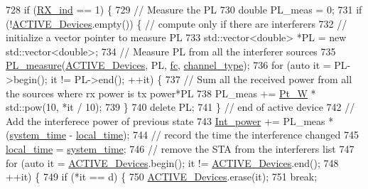 \begin{DoxyCode}
{{{728         \textcolor{keywordflow}{if} (\hyperlink{classAP_af5b1c2bc10a9ce9f3007bbf37f95f144}{RX\_ind} == 1) \{
729             \textcolor{comment}{// Measure the PL}
730             \textcolor{keywordtype}{double} PL\_meas = 0;
731             \textcolor{keywordflow}{if} (!\hyperlink{classAP_ab6dd8d2144b1be8dea239c3d76fc60cd}{ACTIVE\_Devices}.empty()) \{ \textcolor{comment}{// compute only if there are interferers}
732                 \textcolor{comment}{// initialize a vector pointer to measure PL}
733                 std::vector<double> *PL = \textcolor{keyword}{new} std::vector<double>;
734                 \textcolor{comment}{// Measure PL from all the interferer sources}
735                 \hyperlink{PL__measure_8cpp_afb433c5f099becf495d3c9d29ffc707d}{PL\_measure}(\hyperlink{classAP_ab6dd8d2144b1be8dea239c3d76fc60cd}{ACTIVE\_Devices}, PL, \hyperlink{classAP_af7f928faaa72cbfe5c4f905cb146a564}{fc}, 
      \hyperlink{classAP_a334f5b7be9725824797db57032de80e2}{channel\_type});
736                 \textcolor{keywordflow}{for} (\textcolor{keyword}{auto} it = PL->begin(); it != PL->end(); ++it) \{
737                     \textcolor{comment}{// Sum all the received power from all the sources where rx power is tx power*PL}
738                     PL\_meas += \hyperlink{classAP_a10998008dbe6e924211af8d9ee155534}{Pt\_W} * std::pow(10, *it / 10);
739                 \}
740                 \textcolor{keyword}{delete} PL;
741             \} \textcolor{comment}{// end of active device}
742               \textcolor{comment}{// Add the interferece power of previous state}
743             \hyperlink{classAP_a6c2c3e61c88d4bba7d949f5663b3ea10}{Int\_power} += PL\_meas * (\hyperlink{AP_8cpp_aaa03a568dc1d9d3391286ea24b9cfb63}{system\_time} - \hyperlink{classAP_ab31a52cd05ca5daf9ccd5d24941fe395}{local\_time});
744             \textcolor{comment}{// record the time the interference changed}
745             \hyperlink{classAP_ab31a52cd05ca5daf9ccd5d24941fe395}{local\_time} = \hyperlink{AP_8cpp_aaa03a568dc1d9d3391286ea24b9cfb63}{system\_time};
746             \textcolor{comment}{// remove the STA from the interferers list}
747             \textcolor{keywordflow}{for} (\textcolor{keyword}{auto} it = \hyperlink{classAP_ab6dd8d2144b1be8dea239c3d76fc60cd}{ACTIVE\_Devices}.begin(); it != 
      \hyperlink{classAP_ab6dd8d2144b1be8dea239c3d76fc60cd}{ACTIVE\_Devices}.end();
748                     ++it) \{
749                 \textcolor{keywordflow}{if} (*it == d) \{
750                     \hyperlink{classAP_ab6dd8d2144b1be8dea239c3d76fc60cd}{ACTIVE\_Devices}.erase(it);
751                     \textcolor{keywordflow}{break};
}}}
\end{DoxyCode}
